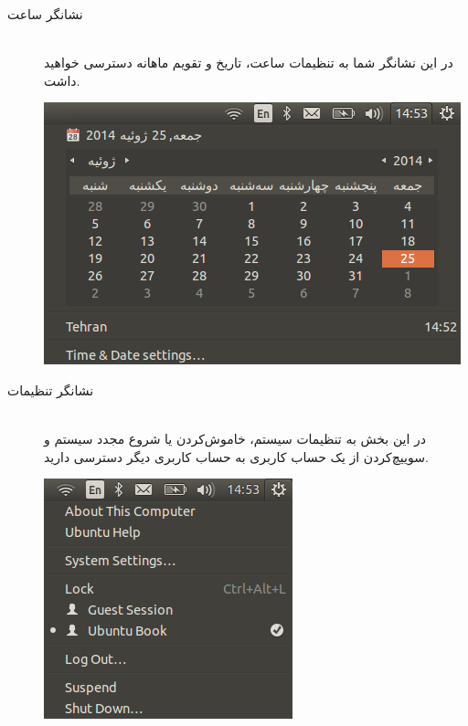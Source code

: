 \begin{description}
\item[نشانگر ساعت] \hfill \\
در این نشانگر شما به تنظیمات ساعت، تاریخ و تقویم ماهانه دسترسی خواهید داشت.
\begin{center}
\includegraphics[scale=0.5]{pics/21.png}
\end{center}

\item[نشانگر تنظیمات] \hfill \\
در این بخش به تنظیمات سیستم، خاموش‌کردن یا شروع مجدد سیستم و سوییچ‌کردن از یک حساب کاربری به حساب کاربری دیگر دسترسی دارید.
\begin{center}
\includegraphics[scale=0.5]{pics/22.png}
\end{center}

\end{description}

